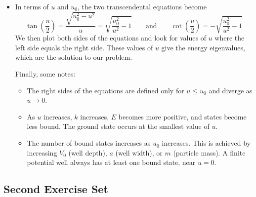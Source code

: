 \documentclass[11pt, a4paper]{article}
\newcommand{\eqtext}[1]{\qquad \text{#1} \qquad}
\begin{document}
\begin{itemize}
	\item In terms of $ u $ and $ u_{0} $, the two transcendental equations become
	\begin{equation*}
		\tan(\frac{u}{2}) = \frac{\sqrt{u_{0}^{2} - u^{2}}}{u} = \sqrt{\frac{u_{0}^{2}}{u^{2}} - 1} \eqtext{and} \cot(\frac{u}{2}) = -\sqrt{\frac{u_{0}^{2}}{u^{2}} - 1}
	\end{equation*}
	We then plot both sides of the equations and look for values of $ u $ where the left side equals the right side. These values of $ u $ give the energy eigenvalues, which are the solution to our problem.
	
	Finally, some notes:
	\begin{itemize}
		\item The right sides of the equations are defined only for $ u \leq u_{0} $ and diverge as $ u \to 0 $. 
		
		\item As $ u $ increases, $ k $ increases, $ E $ becomes more positive, and states become less bound. The ground state occurs at the smallest value of $ u $. 
		
		
		\item The number of bound states increases as $ u_{0} $ increases. This is achieved by increasing $ V_{0} $ (well depth), $ a $ (well width), or $ m $ (particle mass).  A finite potential well always has at least one bound state, near $ u = 0 $. 
	\end{itemize}
	
	

\end{itemize}



\subsection{Second Exercise Set}
\end{document}
